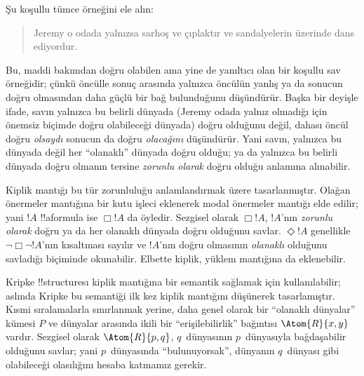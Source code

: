 



Şu koşullu tümce örneğini ele alın:
\begin{quote}
  Jeremy o odada yalnızsa sarhoş ve çıplaktır ve sandalyelerin üzerinde dans
  ediyordur.
\end{quote}
Bu, maddi bakımdan doğru olabilen ama yine de yanıltıcı olan bir koşullu sav
örneğidir; çünkü öncülle sonuç arasında yalnızca öncülün yanlış ya da sonucun
doğru olmasından daha güçlü bir bağ bulunduğunu düşündürür. Başka bir deyişle
ifade, savın yalnızca bu belirli dünyada (Jeremy odada yalnız olmadığı için
önemsiz biçimde doğru olabileceği dünyada) doğru olduğunu değil, dahası öncül
doğru \emph{olsaydı} sonucun da doğru \emph{olacağını} düşündürür. Yani savın,
yalnızca bu dünyada değil her ``olanaklı'' dünyada doğru olduğu; ya da yalnızca
bu belirli dünyada doğru olmanın tersine \emph{zorunlu olarak} doğru olduğu
anlamına alınabilir.

Kiplik mantığı bu tür zorunluluğu anlamlandırmak üzere tasarlanmıştır. Olağan
önermeler mantığına bir kutu işleci eklenerek modal önermeler mantığı elde
edilir; yani $!A$ !!a{formula} ise $\Box !A$ da öyledir. Sezgisel olarak
$\Box !A$, $!A$'nın \emph{zorunlu olarak} doğru ya da her olanaklı dünyada
doğru olduğunu savlar. $\Diamond !A$ genellikle $\lnot \Box \lnot !A$'nın
kısaltması sayılır ve $!A$'nın doğru olmasının \emph{olanaklı} olduğunu
savladığı biçiminde okunabilir. Elbette kiplik, yüklem mantığına da eklenebilir.

Kripke !!{structure}{}sı kiplik mantığına bir semantik sağlamak için
kullanılabilir; aslında Kripke bu semantiği ilk kez kiplik mantığını düşünerek
tasarlamıştır. Kısmi sıralamalarla sınırlanmak yerine, daha genel olarak bir
``olanaklı dünyalar'' kümesi $P$ ve dünyalar arasında ikili bir
``erişilebilirlik'' bağıntısı $\Atom{R}{x,y}$ vardır. Sezgisel olarak
$\Atom{R}{p,q}$, $q$~dünyasının $p$~dünyasıyla bağdaşabilir olduğunu savlar;
yani $p$~dünyasında ``bulunuyorsak'', dünyanın $q$~dünyası gibi olabileceği
olasılığını hesaba katmamız gerekir.

